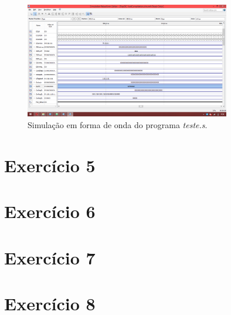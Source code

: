 \documentclass[12pt, a4paper, twoside]{article}
\begin{document}
\begin{figure}
    \centering
    \includegraphics[width=0.8\textwidth]{./figs/sims.png}
    \caption{Simulação em forma de onda do programa \textit{teste.s}.}
\end{figure}

\section{Exercício 5}


\section{Exercício 6}


\section{Exercício 7}


\section{Exercício 8}

\end{document}
